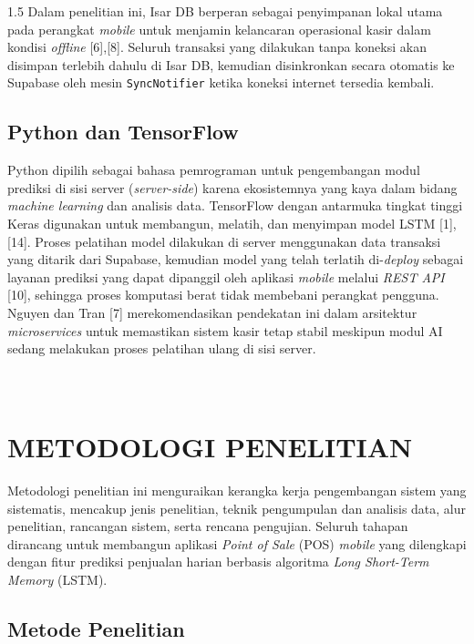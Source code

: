 \documentclass[12pt, a4paper, onecolumn, oneside]{report}
\begin{document}
\begin{spacing}{1.5}
Dalam penelitian ini, Isar DB berperan sebagai penyimpanan lokal utama pada perangkat \textit{mobile} untuk menjamin kelancaran operasional kasir dalam kondisi \textit{offline} [6],[8]. Seluruh transaksi yang dilakukan tanpa koneksi akan disimpan terlebih dahulu di Isar DB, kemudian disinkronkan secara otomatis ke Supabase oleh mesin \texttt{SyncNotifier} ketika koneksi internet tersedia kembali.

\section{Python dan TensorFlow}

Python dipilih sebagai bahasa pemrograman untuk pengembangan modul prediksi di sisi server (\textit{server-side}) karena ekosistemnya yang kaya dalam bidang \textit{machine learning} dan analisis data. TensorFlow dengan antarmuka tingkat tinggi Keras digunakan untuk membangun, melatih, dan menyimpan model LSTM [1],[14]. Proses pelatihan model dilakukan di server menggunakan data transaksi yang ditarik dari Supabase, kemudian model yang telah terlatih di-\textit{deploy} sebagai layanan prediksi yang dapat dipanggil oleh aplikasi \textit{mobile} melalui \textit{REST API} [10], sehingga proses komputasi berat tidak membebani perangkat pengguna. Nguyen dan Tran [7] merekomendasikan pendekatan ini dalam arsitektur \textit{microservices} untuk memastikan sistem kasir tetap stabil meskipun modul AI sedang melakukan proses pelatihan ulang di sisi server.

\chapter[METODOLOGI PENELITIAN]{\\ METODOLOGI PENELITIAN}

Metodologi penelitian ini menguraikan kerangka kerja pengembangan sistem yang sistematis, mencakup jenis penelitian, teknik pengumpulan dan analisis data, alur penelitian, rancangan sistem, serta rencana pengujian. Seluruh tahapan dirancang untuk membangun aplikasi \textit{Point of Sale} (POS) \textit{mobile} yang dilengkapi dengan fitur prediksi penjualan harian berbasis algoritma \textit{Long Short-Term Memory} (LSTM).

\section{Metode Penelitian}


\end{spacing}
\end{document}
